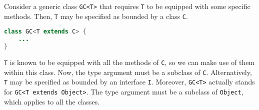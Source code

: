 \documentclass[a4paper, openany]{memoir}
\begin{document}
Consider a generic class \texttt{GC<T>} that requires \texttt{T} to be equipped with some specific methods. Then, \texttt{T} may be specified as bounded by a class \texttt{C}.
\begin{lstlisting}[language=Java]
class GC<T extends C> {
    ...
}
\end{lstlisting}
\texttt{T} is known to be equipped with all the methods of \texttt{C}, so we can make use of them within this class. Now, the type argument must be a subclass of \texttt{C}. Alternatively, \texttt{T} may be specified as bounded by an interface \texttt{I}. Moreover, \texttt{GC<T>} actually stands for \texttt{GC<T extends Object>}. The type argument must be a subclass of \texttt{Object}, which applies to all the classes.

\end{document}
